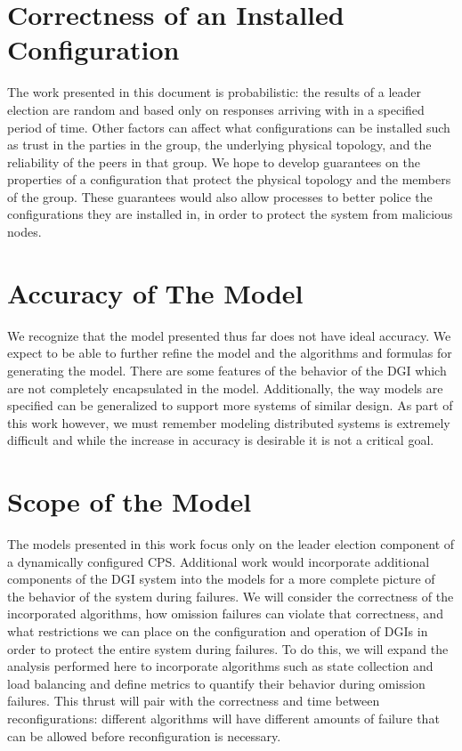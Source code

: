 \section{Correctness of an Installed Configuration}

 The work presented in this document is probabilistic: the results of a leader election are random and based only on responses arriving with in a specified period of time. Other factors can affect what configurations can be installed such as trust in the parties in the group, the underlying physical topology, and the reliability of the peers in that group. We hope to develop guarantees on the properties of a configuration that protect the physical topology and the members of the group. These guarantees would also allow processes to better police the configurations they are installed in, in order to protect the system from malicious nodes.

\section{Accuracy of The Model}

We recognize that the model presented thus far does not have ideal accuracy. We expect to be able to further refine the model and the algorithms and formulas for generating the model. There are some features of the behavior of the DGI which are not completely encapsulated in the model. Additionally, the way models are specified can be generalized to support more systems of similar design. As part of this work however, we must remember modeling distributed systems is extremely difficult and while the increase in accuracy is desirable it is not a critical goal.

\section{Scope of the Model}

The models presented in this work focus only on the leader election component of a dynamically configured CPS. Additional work would incorporate additional components of the DGI system into the models for a more complete picture of the behavior of the system during failures. We will consider the correctness of the incorporated algorithms, how omission failures can violate that correctness, and what restrictions we can place on the configuration and operation of DGIs in order to protect the entire system during failures. To do this, we will expand the analysis performed here to incorporate algorithms such as state collection and load balancing and define metrics to quantify their behavior during omission failures. This thrust will pair with the correctness and time between reconfigurations: different algorithms will have different amounts of failure that can be allowed before reconfiguration is necessary.

